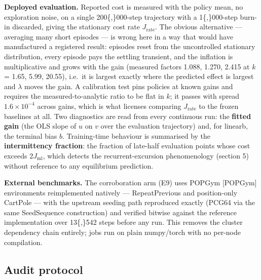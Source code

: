 \textbf{Deployed evaluation.} Reported cost is measured with the policy
mean, no exploration noise, on a single 200\{,\}000-step trajectory with
a 1\{,\}000-step burn-in discarded, giving the stationary cost rate
\(J_{\text{rate}}\). The obvious alternative --- averaging many short
episodes --- is wrong here in a way that would have manufactured a
registered result: episodes reset from the uncontrolled stationary
distribution, every episode pays the settling transient, and the
inflation is multiplicative and grows with the gain (measured factors
1.088, 1.270, 2.415 at \(k\) = 1.65, 5.99, 20.55), i.e.~it is largest
exactly where the predicted effect is largest and \(\lambda\) moves the
gain. A calibration test pins policies at known gains and requires the
measured-to-analytic ratio to be flat in \(k\); it passes with spread
\(1.6\times10^{-4}\) across gains, which is what licenses comparing
\(J_{\text{rate}}\) to the frozen baselines at all. Two diagnostics are
read from every continuous run: the \textbf{fitted gain} (the OLS slope
of \(u\) on \(v\) over the evaluation trajectory) and, for linearb, the
terminal bias \(b\). Training-time behaviour is summarised by the
\textbf{intermittency fraction}: the fraction of late-half evaluation
points whose cost exceeds \(2 J_{\text{ml}}\), which detects the
recurrent-excursion phenomenology (section 5) without reference to any
equilibrium prediction.

\textbf{External benchmarks.} The corroboration arm (E9) uses POPGym
{[}POPGym{]} environments reimplemented natively --- RepeatPrevious and
position-only CartPole --- with the upstream seeding path reproduced
exactly (PCG64 via the same SeedSequence construction) and verified
bitwise against the reference implementation over 13\{,\}542 steps
before any run. This removes the cluster dependency chain entirely; jobs
run on plain numpy/torch with no per-node compilation.


\subsection{Audit protocol}

